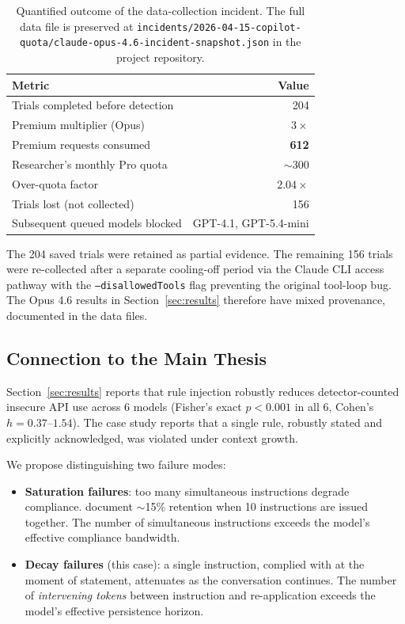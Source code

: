\documentclass[11pt,a4paper]{article}
\begin{document}
\begin{table}[h]
\centering
\small
\begin{tabular}{lr}
\toprule
\textbf{Metric} & \textbf{Value} \\
\midrule
Trials completed before detection & 204 \\
Premium multiplier (Opus) & $3\times$ \\
Premium requests consumed & \textbf{612} \\
Researcher's monthly Pro quota & $\sim$300 \\
Over-quota factor & $2.04\times$ \\
Trials lost (not collected) & 156 \\
Subsequent queued models blocked & GPT-4.1, GPT-5.4-mini \\
\bottomrule
\end{tabular}
\caption{Quantified outcome of the data-collection incident. The full data file is preserved at \texttt{incidents/2026-04-15-copilot-quota/claude-opus-4.6-incident-snapshot.json} in the project repository.}
\label{tab:incident}
\end{table}

The 204 saved trials were retained as partial evidence. The remaining 156 trials were re-collected after a separate cooling-off period via the Claude CLI access pathway with the \texttt{--disallowedTools} flag preventing the original tool-loop bug. The Opus 4.6 results in Section~\ref{sec:results} therefore have mixed provenance, documented in the data files.

\subsection{Connection to the Main Thesis}

Section~\ref{sec:results} reports that rule injection robustly reduces detector-counted insecure API use across 6 models (Fisher's exact $p < 0.001$ in all 6, Cohen's $h = 0.37$--$1.54$). The case study reports that a single rule, robustly stated and explicitly acknowledged, was violated under context growth.

We propose distinguishing two failure modes:

\begin{itemize}
    \item \textbf{Saturation failures}: too many simultaneous instructions degrade compliance. \citet{he2025curse} document $\sim$15\% retention when 10 instructions are issued together. The number of simultaneous instructions exceeds the model's effective compliance bandwidth.

    \item \textbf{Decay failures} (this case): a single instruction, complied with at the moment of statement, attenuates as the conversation continues. The number of \emph{intervening tokens} between instruction and re-application exceeds the model's effective persistence horizon.
\end{itemize}
\end{document}
